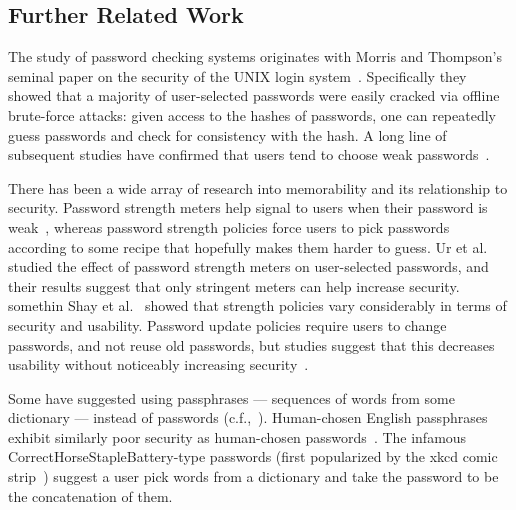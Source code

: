 \subsection{Further Related Work}
\label{sec:relwork}

The study of password checking systems
originates with Morris and Thompson's seminal paper on the security of the UNIX
login system~\cite{morris}. Specifically they showed that a majority of
user-selected passwords were easily cracked via offline brute-force attacks:
given access to the hashes of passwords, one can repeatedly guess passwords and
check for consistency with the hash. A long line of subsequent studies have
confirmed that users tend to choose weak passwords~\cite{bonneau12,of,papers}. 

There has been a wide array of research into memorability
and its relationship to security. Password strength
meters help signal to users when their password is
weak~\cite{others,komanduri2014telepathwords}, whereas password strength
policies force users to pick passwords according to some recipe that hopefully
makes them harder to guess.  Ur et al.~\cite{ur2012does} studied the effect of
password strength meters on user-selected passwords, and their results suggest
that only stringent meters can help increase security. somethin  Shay et
al.~\cite{shay2014can} showed that strength policies vary considerably in terms
of security and usability. Password update policies require users to change
passwords, and not reuse old passwords, but studies suggest that this
decreases usability without noticeably increasing
security~\cite{zhang:2010:security}.  

Some have suggested using passphrases --- sequences of words from some
dictionary --- instead of passwords (c.f.,~\cite{porter1982password}).
Human-chosen English passphrases exhibit similarly poor security as
human-chosen passwords~\cite{bonneau2012linguistic}.  The infamous
CorrectHorseStapleBattery-type passwords (first popularized by the xkcd comic
strip~\cite{xkcd}) suggest a user pick words from a dictionary and take the
password to be the concatenation of them. 

